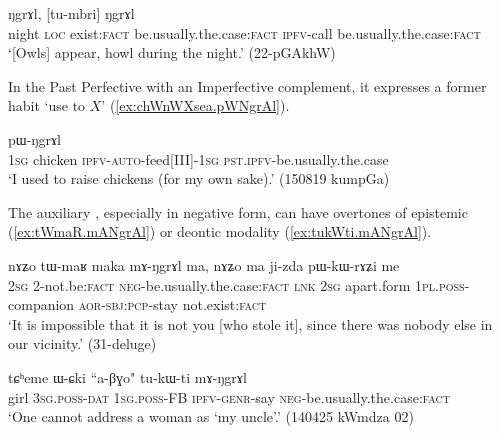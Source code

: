 \begin{exe}
\ex \label{ex:tu.NgrAl}
  ŋgrɤl, [tu-mbri] ŋgrɤl \\
night \textsc{loc} exist:\textsc{fact} be.usually.the.case:\textsc{fact} \textsc{ipfv}-call be.usually.the.case:\textsc{fact} \\
\glt `[Owls] appear, howl during the night.' (22-pGAkhW)
\end{exe}

In the Past Perfective with an Imperfective complement, it expresses a former habit `use to $X$'  (\ref{ex:chWnWXsea.pWNgrAl}).

\begin{exe}
\ex \label{ex:chWnWXsea.pWNgrAl}
  pɯ-ŋgrɤl  \\
\textsc{1sg}  chicken \textsc{ipfv}-\textsc{auto}-feed[III]-\textsc{1sg} \textsc{pst}.\textsc{ipfv}-be.usually.the.case \\
\glt `I used to raise chickens (for my own sake).' (150819 kumpGa)
\end{exe}

The auxiliary , especially in negative form, can have overtones of epistemic (\ref{ex:tWmaR.mANgrAl}) or deontic modality (\ref{ex:tukWti.mANgrAl}).

\begin{exe}
\ex \label{ex:tWmaR.mANgrAl}
 \gll nɤʑo tɯ-maʁ maka mɤ-ŋgrɤl ma, nɤʑo ma ji-zda pɯ-kɯ-rɤʑi me \\
 \textsc{2sg} 2-not.be:\textsc{fact} \textsc{neg}-be.usually.the.case:\textsc{fact} \textsc{lnk} \textsc{2sg} apart.form \textsc{1pl}.\textsc{poss}-companion \textsc{aor}-\textsc{sbj}:\textsc{pcp}-stay not.exist:\textsc{fact} \\
\glt `It is impossible that it is not you [who stole it], since there was nobody else in our vicinity.' (31-deluge)
\end{exe}

\begin{exe}
\ex \label{ex:tukWti.mANgrAl}
 \gll tɕʰeme ɯ-ɕki ``a-βɣo" tu-kɯ-ti mɤ-ŋgrɤl \\
 girl \textsc{3sg}.\textsc{poss}-\textsc{dat} \textsc{1sg}.\textsc{poss}-FB \textsc{ipfv}-\textsc{genr}-say \textsc{neg}-be.usually.the.case:\textsc{fact} \\
\glt `One cannot address a woman as `my uncle'.' (140425 kWmdza 02)
\end{exe} 

